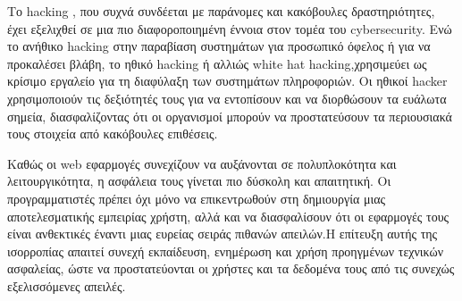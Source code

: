 Το \lt hacking \gt, που συχνά συνδέεται με παράνομες και κακόβουλες δραστηριότητες, έχει εξελιχθεί σε μια πιο διαφοροποιημένη έννοια στον τομέα του \lt cybersecurity\gt. Ενώ το ανήθικο \lt hacking  στην παραβίαση συστημάτων για προσωπικό όφελος ή για να προκαλέσει βλάβη, το ηθικό \lt hacking \gt ή αλλιώς \lt white hat hacking,\gt χρησιμεύει ως κρίσιμο εργαλείο για τη διαφύλαξη των συστημάτων πληροφοριών. Οι ηθικοί \lt hacker \gt χρησιμοποιούν τις δεξιότητές τους για να εντοπίσουν και να διορθώσουν τα ευάλωτα σημεία, διασφαλίζοντας ότι οι οργανισμοί μπορούν να προστατεύσουν τα περιουσιακά τους στοιχεία από κακόβουλες επιθέσεις. 

Καθώς οι \lt web \gt εφαρμογές  συνεχίζουν να αυξάνονται σε πολυπλοκότητα και λειτουργικότητα, η ασφάλεια τους γίνεται πιο δύσκολη και απαιτητική. Οι προγραμματιστές πρέπει όχι μόνο να επικεντρωθούν στη δημιουργία μιας αποτελεσματικής εμπειρίας χρήστη, αλλά και να διασφαλίσουν ότι οι εφαρμογές τους είναι ανθεκτικές έναντι μιας ευρείας σειράς πιθανών απειλών.Η επίτευξη αυτής της ισορροπίας απαιτεί συνεχή εκπαίδευση, ενημέρωση και χρήση προηγμένων τεχνικών ασφαλείας, ώστε να προστατεύονται οι χρήστες και τα δεδομένα τους από τις συνεχώς εξελισσόμενες απειλές. 

